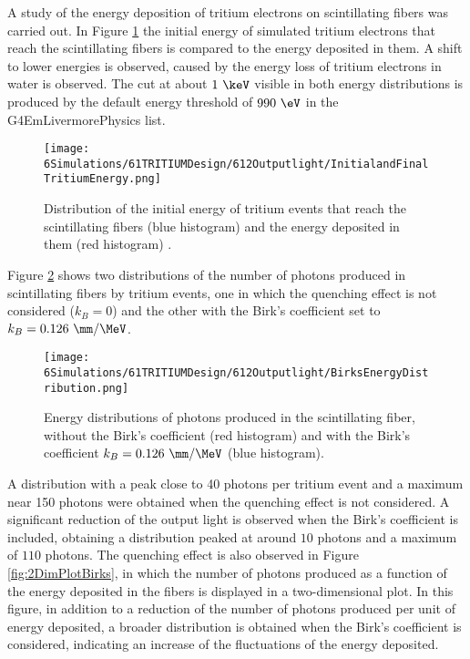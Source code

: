 A study of the energy deposition of tritium electrons on scintillating fibers was carried out. In Figure \ref{fig:InitialFinalTritiumEnergy} the initial energy of simulated tritium electrons that reach the scintillating fibers is compared to the energy deposited in them. A shift to lower energies is observed, caused by the energy loss of tritium electrons in water is observed. The cut at about $1~\keV$ visible in both energy distributions is produced by the default energy threshold of $990~\eV$ in the G4EmLivermorePhysics list.
\begin{figure}[h]
\centering
\texttt{[image: 6Simulations/61TRITIUMDesign/612Outputlight/InitialandFinalTritiumEnergy.png]}
\caption{Distribution of the initial energy of tritium events that reach the scintillating fibers (blue histogram) and the energy deposited in them (red histogram) \cite{SimulationPaperCarlos}.\label{fig:InitialFinalTritiumEnergy}}
\end{figure}
Figure \ref{fig:BirksEffectinEnergyDistribution} shows two distributions of the number of photons produced in scintillating fibers by tritium events, one in which the quenching effect is not considered ($k_B=0$) and the other with the Birk's coefficient set to $k_B=0.126~\mm/\MeV$.
\begin{figure}[h]
\centering
\texttt{[image: 6Simulations/61TRITIUMDesign/612Outputlight/BirksEnergyDistribution.png]}
\caption{Energy distributions of photons produced in the scintillating fiber, without the Birk's coefficient (red histogram) and with the Birk's coefficient $k_B=0.126~\mm/\MeV$ (blue histogram)\cite{SimulationPaperCarlos}.\label{fig:BirksEffectinEnergyDistribution}}
\end{figure}  
A distribution with a peak close to 40 photons per tritium event and a maximum near 150 photons were obtained when the quenching effect is not considered. A significant reduction of the output light is observed when the Birk's coefficient is included, obtaining a distribution peaked at around $10$ photons and a maximum of $110$ photons. The quenching effect is also observed in Figure \ref{fig:2DimPlotBirks}, in which the number of photons produced  as a function of the energy deposited in the fibers is displayed in a two-dimensional plot. In this figure, in addition to a reduction of the number of photons produced per unit of energy deposited, a broader distribution is obtained when the Birk's coefficient is considered, indicating an increase of the fluctuations of the energy deposited.

